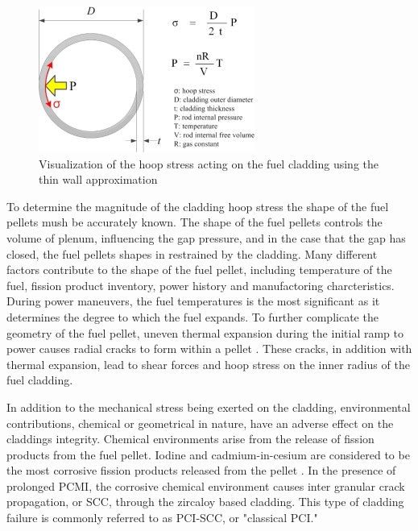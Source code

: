 \documentclass[edeposit,fullpage,11pt]{uiucthesis2009}
\begin{document}
\begin{figure}
\begin{center}
\includegraphics[width=0.5\linewidth]{./Figures/hoop_stress_cite.jpg}
\caption{Visualization of the hoop stress acting on the fuel cladding using the thin wall approximation \cite{kook_review_2013}}
\label{fig:hoop_stress_cite}
\end{center}
\end{figure}

To determine the magnitude of the cladding hoop stress the shape of the fuel pellets mush be accurately known.
The shape of the fuel pellets controls the volume of plenum, influencing the gap pressure, and in the case that the gap has closed, the fuel pellets shapes in restrained by the cladding. 
Many different factors contribute to the shape of the fuel pellet, including temperature of the fuel, fission product inventory, power history and manufactoring charcteristics.
During power maneuvers, the fuel temperatures is the most significant as it determines the degree to which the fuel expands.
To further complicate the geometry of the fuel pellet, uneven thermal expansion during the initial ramp to power causes radial cracks to form within a pellet \cite{capps_evaluation_2016}.
These cracks, in addition with thermal expansion, lead to shear forces and hoop stress on the inner radius of the fuel cladding.
  
In addition to the mechanical stress being exerted on the cladding, environmental contributions, chemical or geometrical in nature, have an adverse effect on the claddings integrity.
Chemical environments arise from the release of fission products from the fuel pellet.
Iodine and cadmium-in-cesium are considered to be the most corrosive fission products released from the pellet \cite{capps_evaluation_2016}. 
In the presence of prolonged \gls{PCMI}, the corrosive chemical environment causes inter granular crack propagation, or \gls{SCC}, through the zircaloy based cladding.
This type of cladding failure is commonly referred to as \gls{PCI}-\gls{SCC}, or "classical \gls{PCI}."
\end{document}
